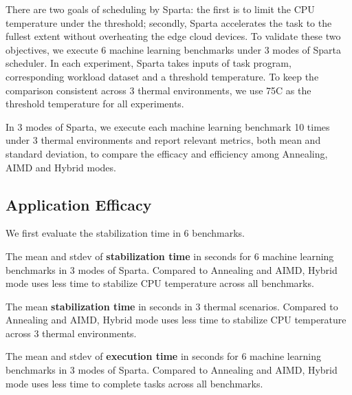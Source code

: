 There are two goals of scheduling by Sparta: the first is to limit the CPU temperature under the threshold; secondly, Sparta accelerates the task to the fullest extent without overheating the edge cloud devices. To validate these two objectives, we execute 6 machine learning benchmarks under 3 modes of Sparta scheduler. In each experiment, Sparta takes inputs of task program, corresponding workload dataset and a threshold temperature. To keep the comparison consistent across 3 thermal environments, we use 75\degree C as the threshold temperature for all experiments.

In 3 modes of Sparta, we execute each machine learning benchmark 10 times under 3 thermal environments and report relevant metrics, both mean and standard deviation, to compare the efficacy and efficiency among Annealing, AIMD and Hybrid modes.


\subsection{Application Efficacy}

We first evaluate the stabilization time in 6 benchmarks. 


\begin{table}[h!]
\caption{The mean and stdev of \textbf{stabilization time} in seconds for 6 machine learning benchmarks in 3 modes of Sparta. Compared to Annealing and AIMD, Hybrid mode uses less time to stabilize CPU temperature across all benchmarks. }\label{tab:stab}
\vspace{1mm}
\centering
\resizebox{350pt}{!}{}
\end{table}


\begin{table}[h!]
\caption{The mean \textbf{stabilization time} in seconds in 3 thermal scenarios. Compared to Annealing and AIMD, Hybrid mode uses less time to stabilize CPU temperature across 3 thermal environments.  }\label{tab:stab_th}
\vspace{1mm}
\centering
\resizebox{350pt}{!}{}
\end{table}



\begin{table}[h!]
\caption{The mean and stdev of \textbf{execution time} in seconds for 6 machine learning benchmarks in 3 modes of Sparta. Compared to Annealing and AIMD, Hybrid mode uses less time to complete tasks across all benchmarks. }\label{tab:runtime}
\vspace{1mm}
\centering
\resizebox{350pt}{!}{}
\end{table}

